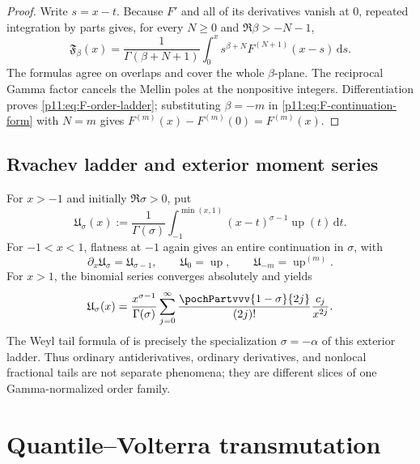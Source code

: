 \documentclass[11pt,oneside]{article}
\theoremstyle{definition}
\theoremstyle{remark}
\newcommand{\Up}{\operatorname{up}}
\newcommand{\dd}{\,\mathrm d}
\newcommand{\1}{\mathbf 1}
\begin{document}
\begin{proof}
Write $s=x-t$.  Because $F'$ and all of its derivatives vanish at $0$,
repeated integration by parts gives, for every $N\ge0$ and
$\Re\beta>-N-1$,
\begin{equation}
 \mathfrak F_\beta(x)
 =\frac1{\Gamma(\beta+N+1)}
   \int_0^x s^{\beta+N}F^{(N+1)}(x-s)\dd s.
 \label{p11:eq:F-continuation-form}
\end{equation}
The formulas agree on overlaps and cover the whole $\beta$-plane.  The
reciprocal Gamma factor cancels the Mellin poles at the nonpositive integers.
Differentiation proves \eqref{p11:eq:F-order-ladder}; substituting $\beta=-m$ in
\eqref{p11:eq:F-continuation-form} with $N=m$ gives
$F^{(m)}(x)-F^{(m)}(0)=F^{(m)}(x)$.
\end{proof}

\subsection{Rvachev ladder and exterior moment series}

For $x>-1$ and initially $\Re\sigma>0$, put
\begin{equation}
 \mathfrak U_\sigma(x)
 :=\frac1{\Gamma(\sigma)}
   \int_{-1}^{\min(x,1)}(x-t)^{\sigma-1}\Up(t)\dd t.
 \label{p11:eq:up-entire-ladder}
\end{equation}
For $-1<x<1$, flatness at $-1$ again gives an entire continuation in
$\sigma$, with
\begin{equation}
 \partial_x\mathfrak U_\sigma=\mathfrak U_{\sigma-1},
 \qquad
 \mathfrak U_0=\Up,
 \qquad
 \mathfrak U_{-m}=\Up^{(m)}.
 \label{p11:eq:up-entire-order-values}
\end{equation}
For $x>1$, the binomial series converges absolutely and yields
\begin{equation}
 \mathfrak U_\sigma(x)
 =\frac{x^{\sigma-1}}{\Gamma(\sigma)}
  \sum_{j=0}^{\infty}
  \frac{\pochPartvvv{1-\sigma}{2j}}{(2j)!}
  \frac{c_j}{x^{2j}}.
 \label{p11:eq:up-exterior-general-series}
\end{equation}
The Weyl tail formula of  is precisely the specialization
$\sigma=-\alpha$ of this exterior ladder.  Thus ordinary antiderivatives,
ordinary derivatives, and nonlocal fractional tails are not separate
phenomena; they are different slices of one Gamma-normalized order family.

\section{Quantile--Volterra transmutation}
\label{p11:sec:quantile-transmutation}
\end{document}
